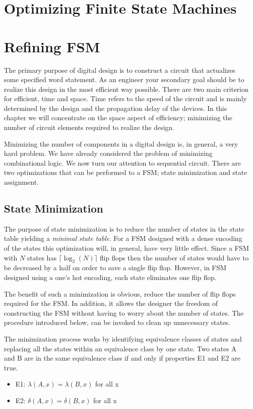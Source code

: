 \chapter{Optimizing Finite State Machines}
\label{chapter:Optimize Finite State Machines}
\graphicspath{ {./chapter11/Fig} }

\chapter{Refining FSM}

The primary purpose of digital design is to construct a circuit that
actualizes some specified word statement.  As an engineer
your secondary goal should be to realize this design in the
most efficient way possible.  There are two main criterion for
efficient, time and space.  Time refers to the speed of the
circuit and is mainly determined by the design
and the propagation delay of the devices.  In
this chapter we will concentrate on the space aspect of 
efficiency; minimizing the number of circuit elements required
to realize the design.

Minimizing the number of components in a digital design is,
in general, a very hard problem.  We have already considered
the problem of minimizing combinational logic.  We now turn 
our attention to sequential circuit.  There are two optimizations 
that can be performed to a FSM; state minimization and state 
assignment.

\section{State Minimization}
The purpose of state minimization is to reduce the number
of states in the state table yielding a \textit{ minimal state
table}.  For a FSM designed with a dense 
encoding of the states this optimization will, in general, have 
very little effect. Since a FSM with $N$ states has 
$\lceil \log_2(N) \rceil$ flip flops then the number of states
would have to be decreased by a half on order to save a single
flip flop.  However, in FSM designed using a one's hot encoding,
each state eliminates one flip flop.

The benefit of such a minimization is obvious, reduce the 
number of flip flops required for the FSM.  In addition, it allows
the designer the freedom of constructing the FSM without
having to worry about the number of states.  The procedure
introduced below, can be invoked to clean up unnecessary states.

The minimization process works by identifying equivalence
classes of states and replacing all the states within
an equivalence class by one state.  Two states A and B are
in the same equivalence class if and only if properties
E1 and E2 are true.
\begin{itemize}
\item E1: $\lambda (A,x) = \lambda (B,x)$ for all x
\item E2: $\delta(A,x) = \delta(B,x)$ for all x
\end{itemize}

